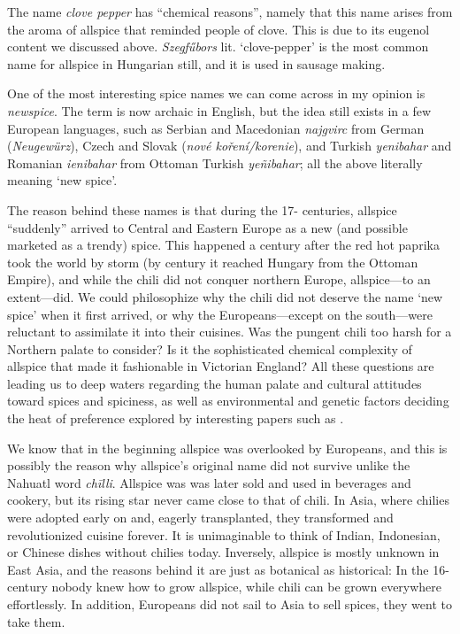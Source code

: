 The name \textit{clove pepper} has ``chemical reasons'', namely that this name arises from the aroma of allspice that reminded people of clove. This is due to its eugenol content we discussed above. \textit{Szegfűbors} lit. `clove-pepper' is the most common name for allspice in Hungarian still, and it is used in sausage making.

One of the most interesting spice names we can come across in my opinion is \textit{newspice}. The term is now archaic in English, but the idea still exists in a few European languages, such as Serbian and Macedonian  \textit{najgvirc} from German (\textit{Neugewürz}), Czech and Slovak (\textit{nové koření/korenie}), and Turkish \textit{yenibahar} and Romanian \textit{ienibahar} from Ottoman Turkish  \textit{yeñibahar}; all the above literally meaning `new spice'.

The reason behind these names is that during the 17- centuries, allspice ``suddenly'' arrived to Central and Eastern Europe as a new (and possible marketed as a trendy) spice. This happened a century after the red hot paprika took the world by storm (by  century it reached Hungary from the Ottoman Empire), and while the chili did not conquer northern Europe, allspice---to an extent---did. We could philosophize why the chili did not deserve the name `new spice' when it first arrived, or why the Europeans---except on the south---were reluctant to assimilate it into their cuisines. Was the pungent chili too harsh for a Northern palate to consider? Is it the sophisticated chemical complexity of allspice that made it fashionable in Victorian England? All these questions are leading us to deep waters regarding the human palate and cultural attitudes toward spices and spiciness, as well as environmental and genetic factors deciding the heat of preference explored by interesting papers such as \textcite{tornwall_why_2012,spence_why_2018}.

We know that in the beginning allspice was overlooked by Europeans, and this is possibly the reason why allspice's original name did not survive unlike the Nahuatl word \textit{chīlli}. Allspice was was later sold and used in beverages and cookery, but its rising star never came close to that of chili.
In Asia, where chilies were adopted early on and, eagerly transplanted, they transformed and revolutionized cuisine forever. It is unimaginable to think of Indian, Indonesian, or Chinese dishes without chilies today. Inversely, allspice is mostly unknown in East Asia, and the reasons behind it are just as botanical as historical: In the 16- century nobody knew how to grow allspice, while chili can be grown everywhere effortlessly. In addition, Europeans did not sail to Asia to sell spices, they went to take them. 

